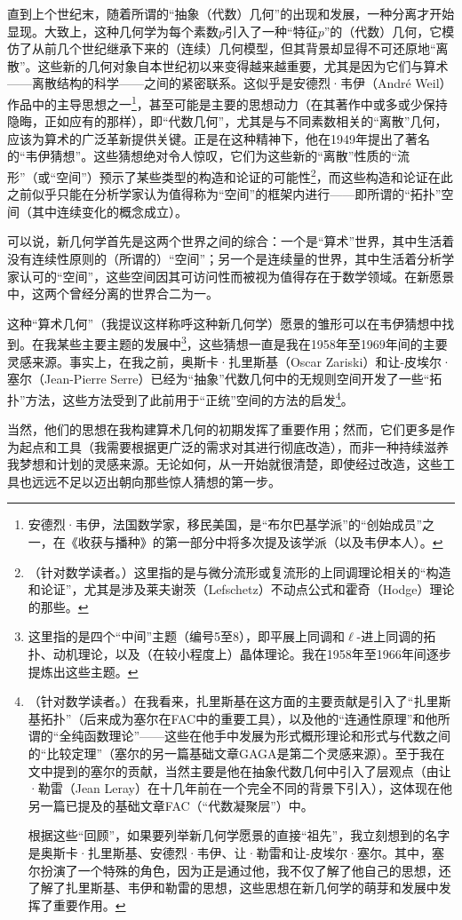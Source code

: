直到上个世纪末，随着所谓的“抽象（代数）几何”的出现和发展，一种分离才开始显现。大致上，这种几何学为每个素数$p$引入了一种“特征$p$”的（代数）几何，它模仿了从前几个世纪继承下来的（连续）几何模型，但其背景却显得不可还原地“离散”。这些新的几何对象自本世纪初以来变得越来越重要，尤其是因为它们与算术——离散结构的科学——之间的紧密联系。这似乎是安德烈·韦伊（André Weil）作品中的主导思想之一\footnote{安德烈·韦伊，法国数学家，移民美国，是“布尔巴基学派”的“创始成员”之一，在《收获与播种》的第一部分中将多次提及该学派（以及韦伊本人）。}，甚至可能是主要的思想动力（在其著作中或多或少保持隐晦，正如应有的那样），即“代数几何”，尤其是与不同素数相关的“离散”几何，应该为算术的广泛革新提供关键。正是在这种精神下，他在1949年提出了著名的“韦伊猜想”。这些猜想绝对令人惊叹，它们为这些新的“离散”性质的“流形”（或“空间”）预示了某些类型的构造和论证的可能性\footnote{（针对数学读者。）这里指的是与微分流形或复流形的上同调理论相关的“构造和论证”，尤其是涉及莱夫谢茨（Lefschetz）不动点公式和霍奇（Hodge）理论的那些。}，而这些构造和论证在此之前似乎只能在分析学家认为值得称为“空间”的框架内进行——即所谓的“拓扑”空间（其中连续变化的概念成立）。

可以说，新几何学首先是这两个世界之间的综合：一个是“算术”世界，其中生活着没有连续性原则的（所谓的）“空间”；另一个是连续量的世界，其中生活着分析学家认可的“空间”，这些空间因其可访问性而被视为值得存在于数学领域。在新愿景中，这两个曾经分离的世界合二为一。

这种“算术几何”（我提议这样称呼这种新几何学）愿景的雏形可以在韦伊猜想中找到。在我某些主要主题的发展中\footnote{这里指的是四个“中间”主题（编号5至8），即平展上同调和$\ell$-进上同调的拓扑、动机理论，以及（在较小程度上）晶体理论。我在1958年至1966年间逐步提炼出这些主题。}，这些猜想一直是我在1958年至1969年间的主要灵感来源。事实上，在我之前，奥斯卡·扎里斯基（Oscar Zariski）和让-皮埃尔·塞尔（Jean-Pierre Serre）已经为“抽象”代数几何中的无规则空间开发了一些“拓扑”方法，这些方法受到了此前用于“正统”空间的方法的启发\footnote{（针对数学读者。）在我看来，扎里斯基在这方面的主要贡献是引入了“扎里斯基拓扑”（后来成为塞尔在FAC中的重要工具），以及他的“连通性原理”和他所谓的“全纯函数理论”——这些在他手中发展为形式概形理论和形式与代数之间的“比较定理”（塞尔的另一篇基础文章GAGA是第二个灵感来源）。至于我在文中提到的塞尔的贡献，当然主要是他在抽象代数几何中引入了层观点（由让·勒雷（Jean Leray）在十几年前在一个完全不同的背景下引入），这体现在他另一篇已提及的基础文章FAC（“代数凝聚层”）中。

根据这些“回顾”，如果要列举新几何学愿景的直接“祖先”，我立刻想到的名字是奥斯卡·扎里斯基、安德烈·韦伊、让·勒雷和让-皮埃尔·塞尔。其中，塞尔扮演了一个特殊的角色，因为正是通过他，我不仅了解了他自己的思想，还了解了扎里斯基、韦伊和勒雷的思想，这些思想在新几何学的萌芽和发展中发挥了重要作用。}。

当然，他们的思想在我构建算术几何的初期发挥了重要作用；然而，它们更多是作为起点和工具（我需要根据更广泛的需求对其进行彻底改造），而非一种持续滋养我梦想和计划的灵感来源。无论如何，从一开始就很清楚，即使经过改造，这些工具也远远不足以迈出朝向那些惊人猜想的第一步。